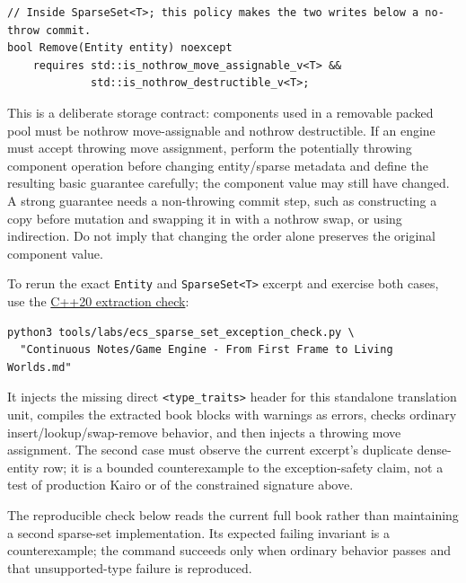 \begin{verbatim}
// Inside SparseSet<T>; this policy makes the two writes below a no-throw commit.
bool Remove(Entity entity) noexcept
    requires std::is_nothrow_move_assignable_v<T> &&
             std::is_nothrow_destructible_v<T>;
\end{verbatim}

This is a deliberate storage contract: components used in a removable packed pool must be nothrow move-assignable and nothrow destructible. If an engine must accept throwing move assignment, perform the potentially throwing component operation before changing entity/sparse metadata and define the resulting basic guarantee carefully; the component value may still have changed. A strong guarantee needs a non-throwing commit step, such as constructing a copy before mutation and swapping it in with a nothrow swap, or using indirection. Do not imply that changing the order alone preserves the original component value.

To rerun the exact \texttt{Entity} and \texttt{SparseSet\textless{}T\textgreater{}} excerpt and exercise both cases, use the \hyperref[source-file-a82fe256cca93e1d7bd6eff8]{C++20 extraction check}:

\begin{verbatim}
python3 tools/labs/ecs_sparse_set_exception_check.py \
  "Continuous Notes/Game Engine - From First Frame to Living Worlds.md"
\end{verbatim}

It injects the missing direct \texttt{\textless{}type\_traits\textgreater{}} header for this standalone translation unit, compiles the extracted book blocks with warnings as errors, checks ordinary insert/lookup/swap-remove behavior, and then injects a throwing move assignment. The second case must observe the current excerpt's duplicate dense-entity row; it is a bounded counterexample to the exception-safety claim, not a test of production Kairo or of the constrained signature above.

The reproducible check below reads the current full book rather than maintaining a second sparse-set implementation. Its expected failing invariant is a counterexample; the command succeeds only when ordinary behavior passes and that unsupported-type failure is reproduced.

